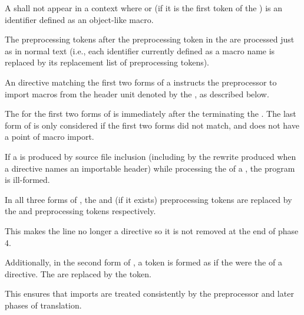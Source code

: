 \pnum
A  shall not
appear in a context where 
or (if it is the first token of the ) 
is an identifier defined as an object-like macro.

\pnum
The preprocessing tokens after the  preprocessing token
in the  
are processed just as in normal text
(i.e., each identifier currently defined as a macro name
is replaced by its replacement list of preprocessing tokens).
\begin{note}
An  directive
matching the first two forms of a 
instructs the preprocessor to import macros
from the header unit
denoted by the ,
as described below.
\end{note}
%
The  for the
first two forms of  is
immediately after the  terminating
the .
The last form of  is only considered
if the first two forms did not match, and
does not have a point of macro import.

\pnum
If a  is produced by source file inclusion
(including by the rewrite produced
when a  directive names an importable header)
while processing the  of a ,
the program is ill-formed.

\pnum
In all three forms of ,
the  and  (if it exists) preprocessing tokens
are replaced by the  and
 preprocessing tokens respectively.
\begin{note}
This makes the line no longer a directive
so it is not removed at the end of phase 4.
\end{note}
Additionally, in the second form of ,
a  token is formed as if
the 
were the  of a  directive.
The  are replaced by
the  token.
\begin{note}
This ensures that imports are treated consistently by
the preprocessor and later phases of translation.
\end{note}

